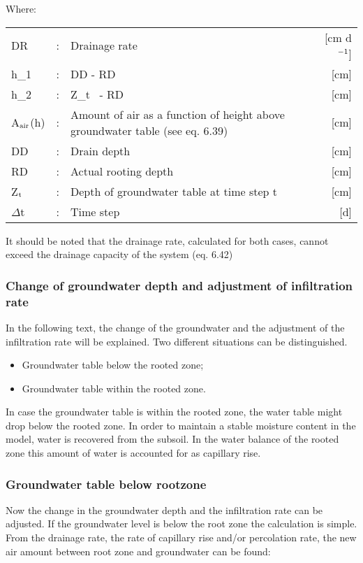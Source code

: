 Where:\\
\begin{tabularx}{\textwidth}{llXr}
DR &:& Drainage rate  & [cm d$^{{\rm -1}}$]\\
h_{1} &:& DD - RD & [cm]\\
h_{2} &:& Z_{t~} - RD & [cm]\\
A$_{{\rm air}}$(h) &:& Amount of air as a function of height above groundwater
   table  (see eq. 6.39) & [cm]\\
DD &:& Drain depth  & [cm]\\
RD &:& Actual rooting depth  & [cm]\\
Z$_{{\rm t}}$ &:& Depth of groundwater table at time step t  & [cm]\\
$\Delta$t &:& Time step  & [d]\\
\end{tabularx}

It should be noted that the drainage rate, calculated for both cases, cannot exceed the
drainage capacity of the system (eq. 6.42)

\subsubsection{Change of groundwater depth and adjustment of infiltration rate}

In the following text, the change of the groundwater and the adjustment of the infiltration
rate will be explained. Two different situations can be distinguished.
\begin{itemize}
\item Groundwater table below the rooted zone;
\item Groundwater table within the rooted zone.
\end{itemize}

In case the groundwater table is within the rooted zone, the water table might drop below
the rooted zone. In order to maintain a stable moisture content in the model, water is
recovered from the subsoil. In the water balance of the rooted zone this amount of water
is accounted for as capillary rise.

\subsubsection{Groundwater table below rootzone}
Now the change in the groundwater depth and the infiltration rate can be adjusted. If the
groundwater level is below the root zone the calculation is simple. From the drainage
rate, the rate of capillary rise and/or percolation rate, the new air amount between root
zone and groundwater can be found:

